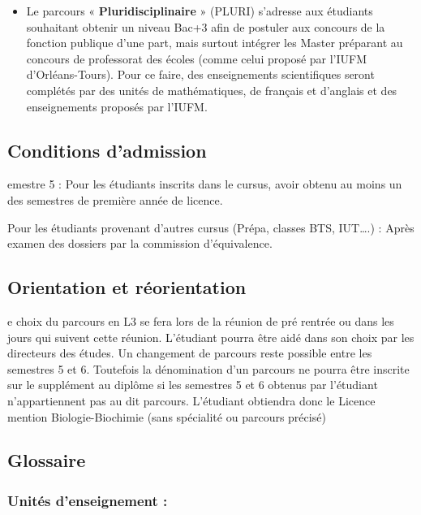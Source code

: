 \documentclass[10pt, a5paper]{report}
\begin{document}
\begin{spacing}{1.5}
\begin{itemize}
\item Le parcours  « \textbf{Pluridisciplinaire} » (PLURI) s’adresse aux étudiants souhaitant obtenir un niveau Bac+3 afin de postuler aux concours de la fonction publique d’une part, mais surtout intégrer les Master préparant au concours de professorat des écoles (comme celui proposé par l’IUFM d’Orléans-Tours). Pour ce faire, des enseignements scientifiques seront complétés par des unités de mathématiques, de français et d’anglais et des enseignements proposés par l’IUFM. 
\end{itemize}

\subsection*{Conditions d'admission}

emestre 5 : Pour les étudiants inscrits dans le cursus, avoir obtenu au moins un des semestres de première année de licence.

Pour les étudiants provenant d’autres cursus (Prépa, classes BTS, IUT….) : Après examen des dossiers par la commission d’équivalence.

\subsection*{Orientation et réorientation}

e choix du parcours en L3 se fera lors de la réunion de pré rentrée ou dans les jours qui suivent cette réunion. L’étudiant pourra être aidé dans son choix par les directeurs des études. Un changement de parcours reste possible entre les semestres 5 et 6. Toutefois la dénomination d’un parcours ne pourra être inscrite sur le supplément au diplôme si les semestres 5 et 6 obtenus par l’étudiant n’appartiennent pas au dit parcours. L’étudiant obtiendra donc le Licence mention Biologie-Biochimie (sans spécialité ou parcours précisé)

\subsection*{Glossaire}

\subsubsection*{Unités d’enseignement :} 


\end{spacing}
\end{document}
